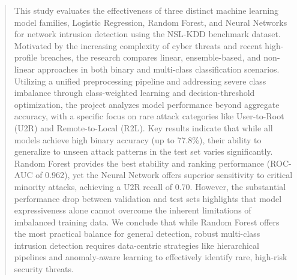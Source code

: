 \documentclass[oneside, master=eelt,masteroption=ec]{kulemt}
\begin{document}
\tableofcontents*

\begin{abstract}
  This study evaluates the effectiveness of three distinct machine learning model families, 
  Logistic Regression, Random Forest, and Neural Networks for network intrusion detection 
  using the NSL-KDD benchmark dataset. Motivated by the increasing complexity of cyber threats 
  and recent high-profile breaches, the research compares linear, ensemble-based, 
  and non-linear approaches in both binary and multi-class classification scenarios. 
  Utilizing a unified preprocessing pipeline and addressing severe class imbalance through 
  class-weighted learning and decision-threshold optimization, the project analyzes model performance 
  beyond aggregate accuracy, with a specific focus on rare attack categories like 
  User-to-Root (U2R) and Remote-to-Local (R2L). Key results indicate that while all 
  models achieve high binary accuracy (up to 77.8\%), their ability to generalize to 
  unseen attack patterns in the test set varies significantly. Random Forest provides the 
  best stability and ranking performance (ROC-AUC of 0.962), yet the Neural Network offers 
  superior sensitivity to critical minority attacks, achieving a U2R recall of 0.70. 
  However, the substantial performance drop between validation and test sets highlights 
  that model expressiveness alone cannot overcome the inherent limitations of imbalanced 
  training data. We conclude that while Random Forest offers the most practical balance 
  for general detection, robust multi-class intrusion detection requires data-centric 
  strategies like hierarchical pipelines and anomaly-aware learning to effectively 
  identify rare, high-risk security threats.

\end{abstract}

\listoffiguresandtables


\mainmatter










\end{document}
